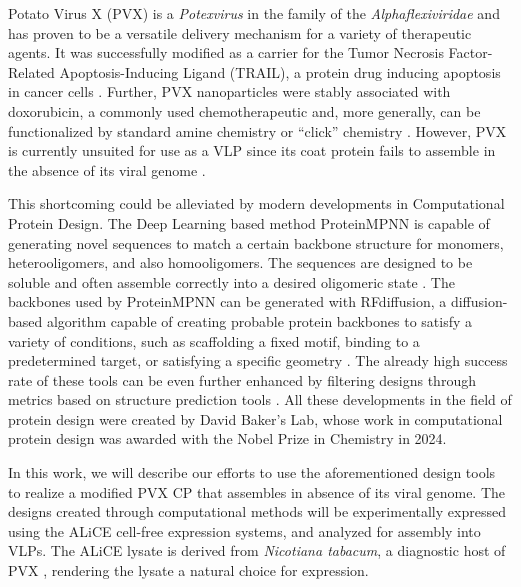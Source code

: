 Potato Virus X (PVX) is a \emph{Potexvirus} in the family of the \emph{Alphaflexiviridae} and has proven to be a versatile delivery mechanism for a variety of therapeutic agents. It was successfully modified as a carrier for the Tumor Necrosis Factor-Related Apoptosis-Inducing Ligand (TRAIL), a protein drug inducing apoptosis in cancer cells \cite{pvx_trail}. Further, PVX nanoparticles were stably associated with doxorubicin, a commonly used chemotherapeutic \cite{pvx_doxorubicin} and, more generally, can be functionalized by standard amine chemistry or ``click'' chemistry \cite{pvx_chemical_modification}. However, PVX is currently unsuited for use as a VLP since its coat protein fails to assemble in the absence of its viral genome \cite{juli_sagt_keine_assembly}.

This shortcoming could be alleviated by modern developments in Computational Protein Design. The Deep Learning based method ProteinMPNN is capable of generating novel sequences to match a certain backbone structure for monomers, heterooligomers, and also homooligomers. The sequences are designed to be soluble and often assemble correctly into a desired oligomeric state \cite{PMPNN2022}. The backbones used by ProteinMPNN can be generated with RFdiffusion, a diffusion-based algorithm capable of creating probable protein backbones to satisfy a variety of conditions, such as scaffolding a fixed motif, binding to a predetermined target, or satisfying a specific geometry \cite{RFdiffusion}. The already high success rate of these tools can be even further enhanced by filtering designs through metrics based on structure prediction tools \cite{physics_binder_design}. All these developments in the field of protein design were created by David Baker's Lab, whose work in computational protein design was awarded with the Nobel Prize in Chemistry in 2024. 

In this work, we will describe our efforts to use the aforementioned design tools to realize a modified PVX CP that assembles in absence of its viral genome. The designs created through computational methods will be experimentally expressed using the ALiCE\textsuperscript{\textregistered} cell-free expression systems, and analyzed for assembly into VLPs. The ALiCE\textsuperscript{\textregistered} lysate is derived from \emph{Nicotiana tabacum}, a diagnostic host of PVX \cite{pvx_host_tabacum}, rendering the lysate a natural choice for expression. 

